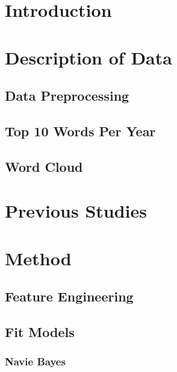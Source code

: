 \documentclass[12pt]{article}
\begin{document}
\section{Introduction} \label{sec:Intro}



\section{Description of Data} \label{sec:Descript}

\subsection{Data Preprocessing}



\subsection{Top 10 Words Per Year}



\subsection{Word Cloud}



\section{Previous Studies}


\section{Method}

\subsection{Feature Engineering}



\subsection{Fit Models}

\subsubsection{Navie Bayes}

\end{document}
